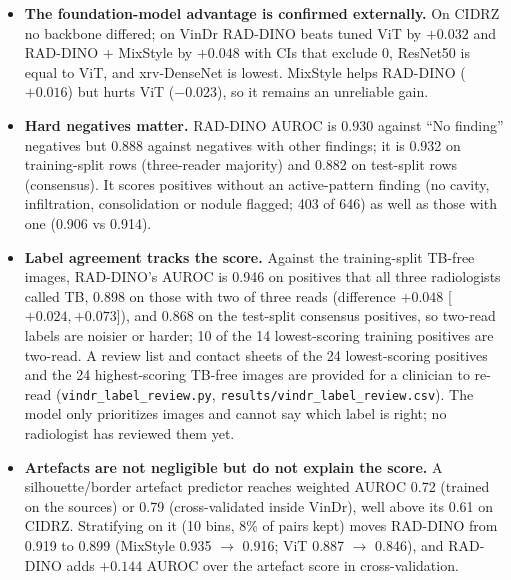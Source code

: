 \documentclass[10pt,a4paper]{article}
\begin{document}
\begin{itemize}
\item \textbf{The foundation-model advantage is confirmed externally.} On CIDRZ no backbone differed; on VinDr RAD-DINO beats tuned ViT by $+0.032$ and RAD-DINO + MixStyle by $+0.048$ with CIs that exclude 0, ResNet50 is equal to ViT, and xrv-DenseNet is lowest. MixStyle helps RAD-DINO ($+0.016$) but hurts ViT ($-0.023$), so it remains an unreliable gain.
\item \textbf{Hard negatives matter.} RAD-DINO AUROC is 0.930 against ``No finding'' negatives but 0.888 against negatives with other findings; it is 0.932 on training-split rows (three-reader majority) and 0.882 on test-split rows (consensus). It scores positives without an active-pattern finding (no cavity, infiltration, consolidation or nodule flagged; 403 of 646) as well as those with one (0.906 vs 0.914).
\item \textbf{Label agreement tracks the score.} Against the training-split TB-free images, RAD-DINO's AUROC is 0.946 on positives that all three radiologists called TB, 0.898 on those with two of three reads (difference $+0.048$ [$+0.024,+0.073$]), and 0.868 on the test-split consensus positives, so two-read labels are noisier or harder; 10 of the 14 lowest-scoring training positives are two-read. A review list and contact sheets of the 24 lowest-scoring positives and the 24 highest-scoring TB-free images are provided for a clinician to re-read (\texttt{vindr\_label\_review.py}, \texttt{results/vindr\_label\_review.csv}). The model only prioritizes images and cannot say which label is right; no radiologist has reviewed them yet.
\item \textbf{Artefacts are not negligible but do not explain the score.} A silhouette/border artefact predictor reaches weighted AUROC 0.72 (trained on the sources) or 0.79 (cross-validated inside VinDr), well above its 0.61 on CIDRZ. Stratifying on it (10 bins, 8\% of pairs kept) moves RAD-DINO from 0.919 to 0.899 (MixStyle 0.935 $\rightarrow$ 0.916; ViT 0.887 $\rightarrow$ 0.846), and RAD-DINO adds $+0.144$ AUROC over the artefact score in cross-validation.
\end{itemize}
\end{document}
